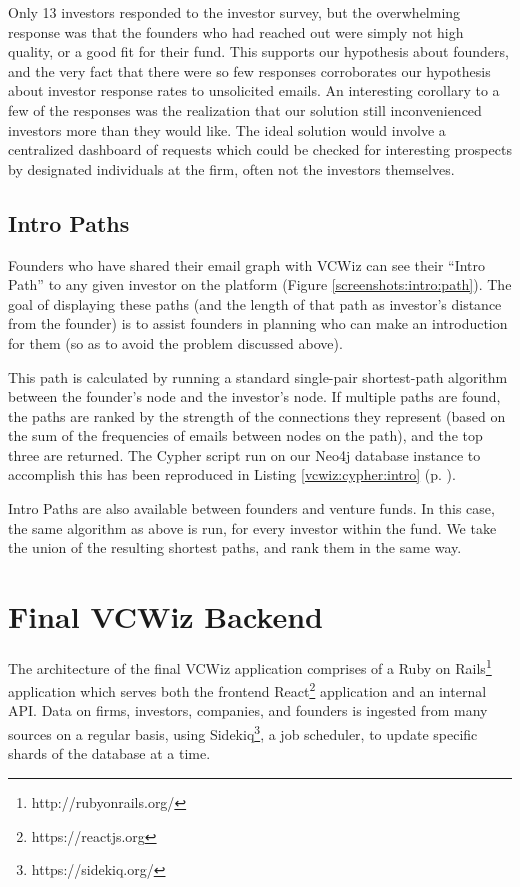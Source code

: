 Only 13 investors responded to the investor survey, but the overwhelming response was that the founders who had reached out were simply not high quality, or a good fit for their fund. This supports our hypothesis about founders, and the very fact that there were so few responses corroborates our hypothesis about investor response rates to unsolicited emails. An interesting corollary to a few of the responses was the realization that our solution still inconvenienced investors more than they would like. The ideal solution would involve a centralized dashboard of requests which could be checked for interesting prospects by designated individuals at the firm, often not the investors themselves.

\subsection{Intro Paths}

Founders who have shared their email graph with VCWiz can see their ``Intro Path'' to any given investor on the platform (Figure \ref{screenshots:intro:path}). The goal of displaying these paths (and the length of that path as investor's distance from the founder) is to assist founders in planning who can make an introduction for them (so as to avoid the problem discussed above).

This path is calculated by running a standard single-pair shortest-path algorithm between the founder's node and the investor's node. If multiple paths are found, the paths are ranked by the strength of the connections they represent (based on the sum of the frequencies of emails between nodes on the path), and the top three are returned. The Cypher script run on our Neo4j database instance to accomplish this has been reproduced in Listing \ref{vcwiz:cypher:intro} (p. \pageref{vcwiz:cypher:intro}).

Intro Paths are also available between founders and venture funds. In this case, the same algorithm as above is run, for every investor within the fund. We take the union of the resulting shortest paths, and rank them in the same way.

\section{Final VCWiz Backend}

The architecture of the final VCWiz application comprises of a Ruby on Rails\footnote{http://rubyonrails.org/} application which serves both the frontend React\footnote{https://reactjs.org} application and an internal API. Data on firms, investors, companies, and founders is ingested from many sources on a regular basis, using Sidekiq\footnote{https://sidekiq.org/}, a job scheduler, to update specific shards of the database at a time.

